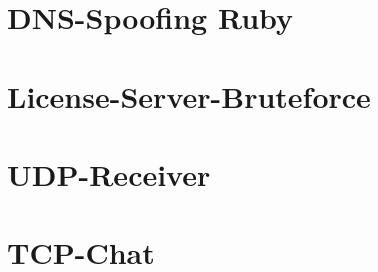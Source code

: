 \documentclass{scrartcl}
\begin{document}
      \begin{appendices}
        \section{DNS-Spoofing Ruby}
          
         \section{License-Server-Bruteforce}
          
        \section{UDP-Receiver}
          
        \section{TCP-Chat}
          
          
      \end{appendices}
\end{document}
